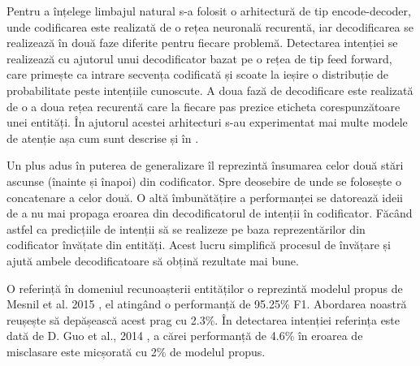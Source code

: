 Pentru a înțelege limbajul natural s-a folosit o arhitectură de tip encode-decoder, unde codificarea este realizată de o rețea neuronală recurentă, iar decodificarea se realizează în două faze diferite pentru fiecare problemă. Detectarea intenției se realizează cu ajutorul unui decodificator bazat pe o rețea de tip feed forward, care primește ca intrare secvența codificată și scoate la ieșire o distribuție de probabilitate peste intențiile cunoscute. A doua fază de decodificare este realizată de o a doua rețea recurentă care la fiecare pas prezice eticheta corespunzătoare unei entități. În ajutorul acestei arhitecturi s-au experimentat mai multe modele de atenție așa cum sunt descrise și în \cite{trans_luong_manning}.

Un plus adus în puterea de generalizare îl reprezintă însumarea celor două stări ascunse (înainte și înapoi) din codificator. Spre deosebire de \cite{att_joint_bing} unde se folosește o concatenare a celor două. O altă îmbunătățire a performanței se datorează ideii de a nu mai propaga eroarea din decodificatorul de intenții în codificator. Făcând astfel ca predicțiile de intenții să se realizeze pe baza reprezentărilor din codificator învățate din entități. Acest lucru simplifică procesul de învățare și ajută ambele decodificatoare să obțină rezultate mai bune.

O referință în domeniul recunoașterii entităților o reprezintă modelul propus de Mesnil et al. 2015 \cite{mesnil-rnn-crf}, el atingând o performanță de 95.25\% F1. Abordarea noastră reușește să depășească acest prag cu 2.3\%. În detectarea intenției referința este dată de  D. Guo et al., 2014 \cite{recursive-nn-intent}, a cărei performanță de 4.6\% în eroarea de misclasare este micșorată cu 2\% de modelul propus.

